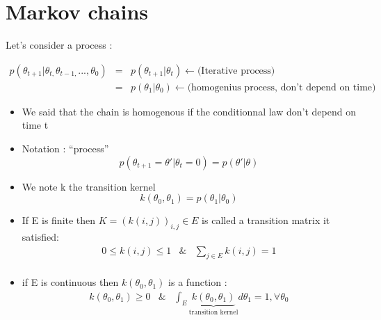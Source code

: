 \section{Markov chains}

\begin{de}

Let's consider a process :

\begin{eqnarray*}
p(\theta_{t+1}|\theta_{t,}\theta_{t-1,}...,\theta_{0}) & = & p(\theta_{t+1}|\theta_{t})\longleftarrow\text{(Iterative process)}\\
 & = & p(\theta_{1}|\theta_{0})\longleftarrow\text{(homogenius process, don't depend on time)}
\end{eqnarray*}

\begin{itemize}
\item We said that the chain is homogenous if the conditionnal law don't
depend on time t
\item Notation : ``process''
\[
p(\theta_{t+1}=\theta'|\theta_{t}=0)=p(\theta'|\theta)
\]

\item We note k the transition kernel
\[
k(\theta_{0},\theta_{1})=p(\theta_{1}|\theta_{0})
\]

\item If E is finite then $K=(k(i,j))_{i,j}\in E$ is called a transition
matrix it satisfied:
\begin{eqnarray*}
0\leq k(i,j)\leq1 & \& & \sum_{j\in E}k(i,j)=1\\
\end{eqnarray*}

\item if E is continuous then $k(\theta_{0},\theta_{1})$ is a function
:
\begin{eqnarray*}
k(\theta_{0},\theta_{1})\geq0 & \& & \int_{E}\underbrace{k(\theta_{0},\theta_{1})}_{\text{transition kernel}}d\theta_{1}=1,\forall\theta_{0}\\
\end{eqnarray*}

\end{itemize}
\end{de}
